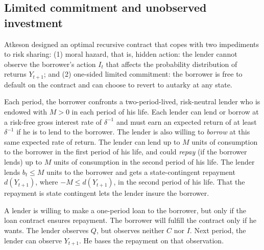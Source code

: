 

\subsection{Limited commitment and unobserved investment}

Atkeson designed an optimal recursive contract that copes with two
impediments to risk sharing:
(1) moral hazard, that is,  hidden action:
  the lender cannot observe the borrower's action
$I_{t}$ that affects the probability distribution of returns $Y_{t+1}$; and
(2) one-sided limited commitment:  the borrower is free to default on the
contract and can choose to revert to autarky at any state.

Each period, the borrower confronts a
two-period-lived, risk-neutral lender who
is endowed with $M >0$ in each period of his life. Each lender
can lend or borrow at a risk-free gross interest rate of $\delta^{-1}$ and
must earn an expected return of at least $\delta^{-1}$ if
he is to lend to the borrower.  The lender is also willing to
{\it borrow\/} at this same expected rate of return.
  The lender
can lend up to $M$ units of consumption to the borrower in the first period
of his life, and could {\it repay} (if the borrower lends)
up to $M$ units of consumption
in the second period of his life.
The lender lends  $b_{t}\leq M$  units to the borrower and
gets a state-contingent repayment $d(Y_{t+1})$, where $-M \leq d(Y_{t+1})$,
 in the second period of his life.
That the repayment is state contingent lets the
lender insure the borrower.


A lender is willing to make a one-period
loan to the borrower, but  only
 if the loan contract ensures repayment.
The borrower will fulfill the contract
only if he wants.
The lender observes  $Q$,  but observes
neither  $C$  nor  $I$. Next period, the lender can
observe $Y_{t+1}$. He bases the repayment
on that observation.




